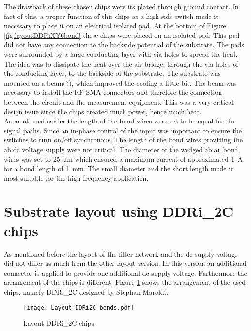 The drawback of these chosen chips were its plated through ground contact. In fact of this, a proper function of this chips as a high side switch made it necessary to place it on an electrical isolated pad.
At the bottom of Figure \ref{fig:layoutDDRiXY6bond} these chips were placed on an isolated pad.
This pad did not have any connection to the backside potential of the substrate.
The pads were surrounded by a large conducting layer with via holes to spread the heat.
The idea was to dissipate the heat over the air bridge, through the via holes of the conducting layer, to the backside of the substrate.
The substrate was mounted on a beam(?), which improved the cooling a little bit.
The beam was necessary to install the RF-SMA connectors and therefore the connection between the circuit and the measurement equipment.
This was a very critical design issue since the chips created much power, hence much heat.
\\
As mentioned earlier the length of the bond wires were set to be equal for the signal paths.
Since an in-phase control of the input was important to ensure the switches to turn on/off synchronous.
The length of the bond wires providing the \gls{ab:dc} voltage supply were not critical.
The diameter of the wedged \gls{ab:au} bond wires was set to \SI{25}{\micro \metre} which ensured a maximum current of approximated \SI{1}{\ampere} for a bond length of \SI{1}{\milli \metre}.
The small diameter and the short length made it most suitable for the high frequency application.



\section{Substrate layout using DDRi\_2C chips}
As mentioned before the layout of the filter network and the dc supply voltage did not differ as much from the other layout version.
In this version an additional connector is applied to provide one additional dc supply voltage.
Furthermore the arrangement of the chips is different.
Figure \ref{fig:layoutDDRi2Cbond} shows the arrangement of the used chips, namely DDRi\_2C designed by Stephan Maroldt.

\begin{figure}[htb!]
	\centering
  \texttt{[image: Layout\_DDRi2C\_bonds.pdf]}
	\caption{Layout DDRi\_2C chips}
	\label{fig:layoutDDRi2Cbond}
\end{figure}

